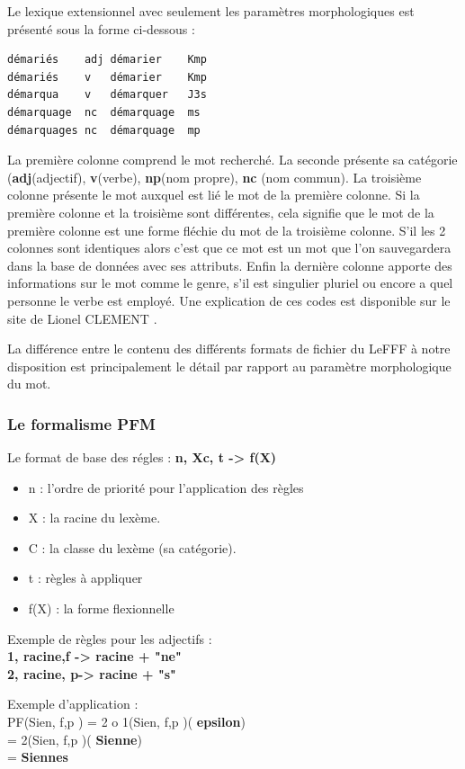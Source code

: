 \documentclass[12pt,a4paper]{article}
\begin{document}
Le lexique extensionnel avec seulement les paramètres morphologiques est présenté sous la forme ci-dessous :
\begin{verbatim}
démariés	adj	démarier	Kmp
démariés	v	démarier	Kmp
démarqua	v	démarquer	J3s
démarquage	nc	démarquage	ms
démarquages	nc	démarquage	mp
\end{verbatim}

\smallbreak La première colonne comprend le mot recherché. 
\smallbreak La seconde présente sa catégorie (\textbf{adj}(adjectif), \textbf{v}(verbe), \textbf{np}(nom propre), \textbf{nc} (nom commun).
\smallbreak La troisième colonne présente le mot auxquel est lié le mot de la première colonne.
Si la première colonne et la troisième sont différentes, cela signifie que le mot de la première colonne est une forme fléchie du mot de la troisième colonne. S'il les 2 colonnes sont identiques alors c'est que ce mot est un mot que l'on sauvegardera dans la base de données avec ses attributs.
Enfin la dernière colonne apporte des informations sur le mot comme le genre, s'il est singulier pluriel ou encore a quel personne le verbe est employé. Une explication de ces codes est disponible sur le site de Lionel CLEMENT \cite{tagset}.

La différence entre le contenu des différents formats de fichier du LeFFF à notre disposition est principalement le détail par rapport au paramètre morphologique du mot.
\subsubsection{Le formalisme PFM  }
      Le format de base des régles : \textbf{n, Xc, t -> f(X) } \\
\begin{itemize}
    \item n : l’ordre de priorité pour l’application des règles
    \item X : la racine du lexème.
    \item C : la classe du lexème (sa catégorie).
    \item t : règles à appliquer
    \item f(X) : la forme flexionnelle
\end{itemize}

Exemple de règles pour les adjectifs : \\
\textbf{1, racine,{f} -> racine + "ne"} \\
\textbf{2, racine, {p}-> racine + "s"}

Exemple d'application : \\
PF(Sien, {f,p} ) = 2 o 1(Sien, {f,p} )(\textbf{ epsilon}) \\
                 = 2(Sien, {f,p} )(\textbf{ Sienne}) \\
                 =\textbf{ Siennes }
\end{document}
